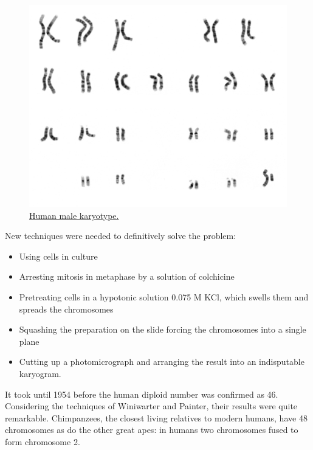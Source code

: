 \begin{figure}

{\centering \includegraphics[width=0.7\linewidth]{./figures/chromosomes/human_male_karyotype} 

}

\caption{\href{https://commons.wikimedia.org/wiki/File:NHGRI_human_male_karyotype.png}{Human male karyotype.}}\label{fig:karyotype}
\end{figure}

New techniques were needed to definitively solve the problem:

\begin{itemize}
\tightlist
\item
  Using cells in culture
\item
  Arresting mitosis in metaphase by a solution of colchicine
\item
  Pretreating cells in a hypotonic solution 0.075 M KCl, which swells them and spreads the chromosomes
\item
  Squashing the preparation on the slide forcing the chromosomes into a single plane
\item
  Cutting up a photomicrograph and arranging the result into an indisputable karyogram.
\end{itemize}

It took until 1954 before the human diploid number was confirmed as 46. Considering the techniques of Winiwarter and Painter, their results were quite remarkable. Chimpanzees, the closest living relatives to modern humans, have 48 chromosomes as do the other great apes: in humans two chromosomes fused to form chromosome 2.


